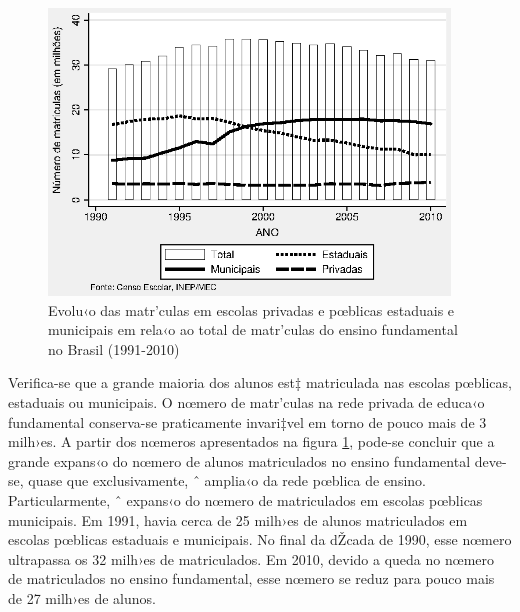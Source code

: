 \documentclass[a4paper, 12pt]{article}
\begin{document}


\begin{figure}[h]
\centering
\begin{footnotesize}
\caption{Evolu‹o das matr’culas em escolas privadas e pœblicas estaduais \newline e municipais em rela‹o ao total de matr’culas do ensino \newline fundamental no Brasil (1991-2010)} 
\label{fig:total_matriculas}                             
 \includegraphics[height=3in]{matriculas_total}
\end{footnotesize}
\end{figure}
 



Verifica-se que a grande maioria dos alunos est‡ matriculada nas escolas pœblicas, estaduais ou municipais. O nœmero de matr’culas na rede privada de educa‹o fundamental conserva-se praticamente invari‡vel em torno de pouco mais de 3 milh›es. A partir dos nœmeros apresentados na figura \ref{fig:total_matriculas}, pode-se concluir que a grande expans‹o do nœmero de alunos matriculados no ensino fundamental deve-se, quase que exclusivamente, ˆ amplia‹o da rede pœblica de ensino. Particularmente, ˆ expans‹o do nœmero de matriculados em escolas pœblicas municipais. Em 1991, havia cerca de 25 milh›es de alunos matriculados em escolas pœblicas estaduais e municipais. No final da dŽcada de 1990, esse nœmero ultrapassa os 32 milh›es de matriculados. Em 2010, devido a queda no nœmero de matriculados no ensino fundamental, esse nœmero se reduz para pouco mais de 27 milh›es de alunos. 
\end{document}

